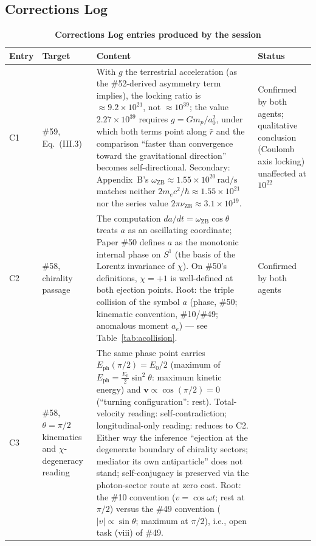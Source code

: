 \documentclass[%
 reprint, amsmath,amssymb, aps, prb, ]{revtex4-2}
\numberwithin{equation}{section}
\newcommand{\iphase}{\theta}  %
\newcommand{\omZB}{\omega_{\text{ZB}}}
\newcommand{\EphS}{E_{\text{ph}}}
\begin{document}
\subsection{Corrections Log}
\label{sec:corrections}

\begin{table}[t!]
\centering
\caption{\textbf{Corrections Log entries produced by the session}}
\label{tab:corrections}
\renewcommand{\arraystretch}{1.4}
\begin{tabular}{p{1.4cm}p{2.4cm}p{7.2cm}p{4.0cm}}
\toprule
\textbf{Entry} & \textbf{Target} & \textbf{Content} & \textbf{Status} \\
\midrule
C1
& \#59, Eq.~(III.3)
& With $g$ the terrestrial acceleration (as the \#52-derived asymmetry term implies), the locking ratio is $\approx 9.2\times10^{21}$, not $\approx10^{39}$; the value $2.27\times10^{39}$ requires $g=Gm_p/a_0^2$, under which both terms point along $\hat r$ and the comparison ``faster than convergence toward the gravitational direction'' becomes self-directional. Secondary: Appendix~B's $\omZB\approx1.55\times10^{20}\,\mathrm{rad/s}$ matches neither $2m_ec^2/\hbar\approx1.55\times10^{21}$ nor the series value $2\pi\nu_{\mathrm{ZB}}\approx3.1\times10^{19}$.
& Confirmed by both agents; qualitative conclusion (Coulomb axis locking) unaffected at $10^{22}$ \\
\addlinespace[0.3cm]
C2
& \#58, chirality passage
& The computation $da/dt=\omZB\cos\iphase$ treats $a$ as an oscillating coordinate; Paper \#50 defines $a$ as the monotonic internal phase on $S^1$ (the basis of the Lorentz invariance of $\chi$). On \#50's definitions, $\chi=+1$ is well-defined at both ejection points. Root: the triple collision of the symbol $a$ (phase, \#50; kinematic convention, \#10/\#49; anomalous moment $a_e$) --- see Table~\ref{tab:acollision}.
& Confirmed by both agents \\
\addlinespace[0.3cm]
C3
& \#58, $\iphase=\pi/2$ kinematics and $\chi$-degeneracy reading
& The same phase point carries $\EphS(\pi/2)=E_0/2$ (maximum of $\EphS=\frac{E_0}{2}\sin^2\iphase$: maximum kinetic energy) and $\mathbf v\propto\cos(\pi/2)=0$ (``turning configuration'': rest). Total-velocity reading: self-contradiction; longitudinal-only reading: reduces to C2. Either way the inference ``ejection at the degenerate boundary of chirality sectors; mediator its own antiparticle'' does not stand; self-conjugacy is preserved via the photon-sector route at zero cost. Root: the \#10 convention ($v=\cos\omega t$; rest at $\pi/2$) versus the \#49 convention ($|v|\propto\sin\iphase$; maximum at $\pi/2$), i.e., open task (viii) of \#49.

\end{tabular}
\end{table}
\end{document}
